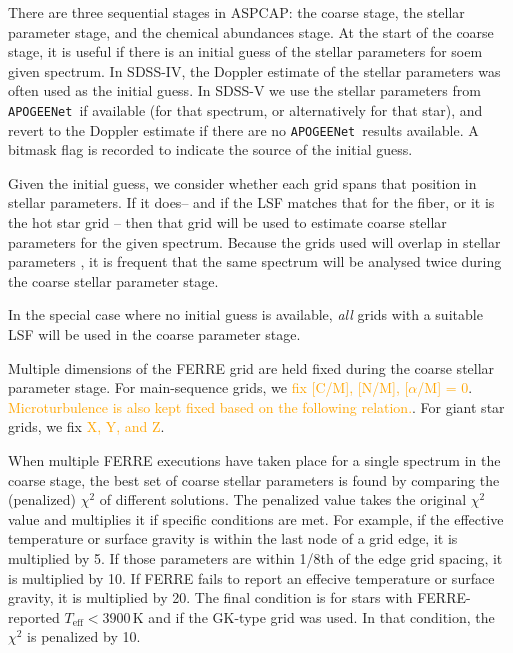 \documentclass[modern]{aastex631}
\newcommand{\astra}{\texttt{Astra}}
\newcommand{\Astra}{\astra}
\newcommand{\pipeline}[1]{\texttt{#1}}
\newcommand{\APOGEENet}{\pipeline{APOGEENet}}
\newcommand{\todo}[1]{\textcolor{orange}{#1}}
\newcommand{\teff}{T_\mathrm{eff}}
\begin{document}
There are three sequential stages in ASPCAP: 
  the coarse stage, 
  the stellar parameter stage, and 
  the chemical abundances stage. 
At the start of the coarse stage, it is useful if there is an initial guess of the stellar parameters for soem given spectrum. In SDSS-IV, the Doppler estimate of the stellar parameters was often used as the initial guess. In SDSS-V we use the stellar parameters from \APOGEENet\ if available (for that spectrum, or alternatively for that star), and revert to the Doppler estimate if there are no \APOGEENet\ results available. A bitmask flag is recorded to indicate the source of the initial guess.

Given the initial guess, we consider whether each grid spans that position in stellar parameters. If it does-- and if the LSF matches that for the fiber, or it is the hot star grid -- then that grid will be used to estimate coarse stellar parameters for the given spectrum. Because the grids used will overlap in stellar parameters \citep{dr17-grids}, it is frequent that the same spectrum will be analysed twice during the coarse stellar parameter stage. 

In the special case where no initial guess is available, \emph{all} grids with a suitable LSF will be used in the coarse parameter stage. 


Multiple dimensions of the FERRE grid are held fixed during the coarse stellar parameter stage. For main-sequence grids, we \todo{fix [C/M], [N/M], [$\alpha$/M] = 0}. \todo{Microturbulence is also kept fixed based on the following relation.}. For giant star grids, we fix \todo{X, Y, and Z}.

When multiple FERRE executions have taken place for a single spectrum in the coarse stage, the best set of coarse stellar parameters is found by comparing the (penalized) $\chi^2$ of different solutions. The penalized value takes the original $\chi^2$ value and multiplies it if specific conditions are met. For example, if the effective temperature or surface gravity is within the last node of a grid edge, it is multiplied by 5. If those parameters are within 1/8th of the edge grid spacing, it is multiplied by 10. If FERRE fails to report an effecive temperature or surface gravity, it is multiplied by 20. The final condition is for stars with FERRE-reported $\teff < 3900$\,K and if the GK-type grid was used. In that condition, the $\chi^2$ is penalized by 10. 


\end{document}
